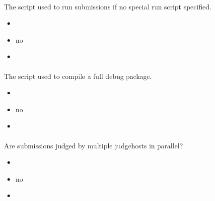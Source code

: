 \documentclass[a4paper,10pt,english,openany]{sphinxmanual}
\begin{document}
\paragraph{}
\label{\detokenize{configuration-reference:default-run}}
\sphinxAtStartPar
The script used to run submissions if no special run script specified.
\begin{itemize}
\item {} 
\sphinxAtStartPar
{} 

\item {} 
\sphinxAtStartPar
{} no

\item {} 
\sphinxAtStartPar
{} 

\end{itemize}


\paragraph{}
\label{\detokenize{configuration-reference:default-full-debug}}
\sphinxAtStartPar
The script used to compile a full debug package.
\begin{itemize}
\item {} 
\sphinxAtStartPar
{} 

\item {} 
\sphinxAtStartPar
{} no

\item {} 
\sphinxAtStartPar
{} 

\end{itemize}


\paragraph{}
\label{\detokenize{configuration-reference:enable-parallel-judging}}
\sphinxAtStartPar
Are submissions judged by multiple judgehosts in parallel?
\begin{itemize}
\item {} 
\sphinxAtStartPar
{} 

\item {} 
\sphinxAtStartPar
{} no

\item {} 
\sphinxAtStartPar
{} 

\end{itemize}
\end{document}
